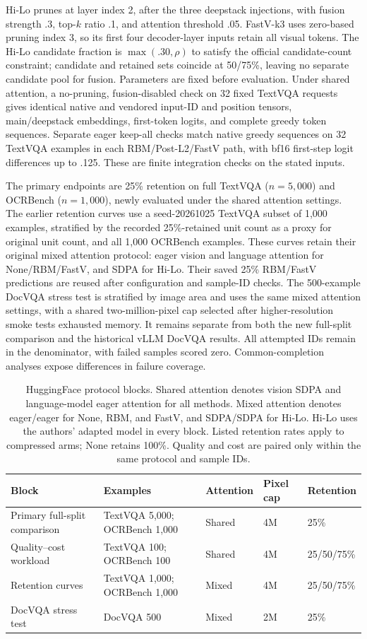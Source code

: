 \documentclass[10pt,twocolumn,letterpaper]{article}
\begin{document}
Hi-Lo prunes at layer index 2, after the three deepstack injections, with fusion strength .3, top-$k$ ratio .1, and attention threshold .05. FastV-k3 uses zero-based pruning index 3, so its first four decoder-layer inputs retain all visual tokens. The Hi-Lo candidate fraction is $\max(.30,\rho)$ to satisfy the official candidate-count constraint; candidate and retained sets coincide at 50/75\%, leaving no separate candidate pool for fusion. Parameters are fixed before evaluation. Under shared attention, a no-pruning, fusion-disabled check on 32 fixed TextVQA requests gives identical native and vendored input-ID and position tensors, main/deepstack embeddings, first-token logits, and complete greedy token sequences. Separate eager keep-all checks match native greedy sequences on 32 TextVQA examples in each RBM/Post-L2/FastV path, with bf16 first-step logit differences up to .125. These are finite integration checks on the stated inputs.

The primary endpoints are 25\% retention on full TextVQA ($n=5{,}000$) and OCRBench ($n=1{,}000$), newly evaluated under the shared attention settings. The earlier retention curves use a seed-20261025 TextVQA subset of 1,000 examples, stratified by the recorded 25\%-retained unit count as a proxy for original unit count, and all 1,000 OCRBench examples. These curves retain their original mixed attention protocol: eager vision and language attention for None/RBM/FastV, and SDPA for Hi-Lo. Their saved 25\% RBM/FastV predictions are reused after configuration and sample-ID checks. The 500-example DocVQA stress test is stratified by image area and uses the same mixed attention settings, with a shared two-million-pixel cap selected after higher-resolution smoke tests exhausted memory. It remains separate from both the new full-split comparison and the historical vLLM DocVQA results. All attempted IDs remain in the denominator, with failed samples scored zero. Common-completion analyses expose differences in failure coverage.

\begin{table}[t]
\centering
\caption{\label{tab:hfprotocols}HuggingFace protocol blocks. Shared attention denotes vision SDPA and language-model eager attention for all methods. Mixed attention denotes eager/eager for None, RBM, and FastV, and SDPA/SDPA for Hi-Lo. Hi-Lo uses the authors' adapted model in every block. Listed retention rates apply to compressed arms; None retains 100\%. Quality and cost are paired only within the same protocol and sample IDs.}
\small
\begin{tabular}{@{}lllll@{}}
\toprule
Block & Examples & Attention & Pixel cap & Retention\\
\midrule
Primary full-split comparison & TextVQA 5,000; OCRBench 1,000 & Shared & 4M & 25\%\\
Quality--cost workload & TextVQA 100; OCRBench 100 & Shared & 4M & 25/50/75\%\\
Retention curves & TextVQA 1,000; OCRBench 1,000 & Mixed & 4M & 25/50/75\%\\
DocVQA stress test & DocVQA 500 & Mixed & 2M & 25\%\\
\bottomrule
\end{tabular}
\end{table}
\end{document}
